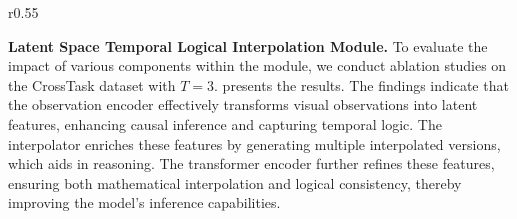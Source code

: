\begin{wraptable}{r}{0.55\textwidth}
\vspace{-10pt}
\centering
\caption{Component ablation. Note: Int: Interpolation, Enc: Encoder, Trans: Transformer.}
\label{tab:component_ablation}
\vspace{-10pt}
\end{wraptable}
\textbf{Latent Space Temporal Logical Interpolation Module.} To evaluate the impact of various components within the module, we conduct ablation studies on the CrossTask dataset with $T=3$.  presents the results. The findings indicate that the observation encoder effectively transforms visual observations into latent features, enhancing causal inference and capturing temporal logic. The interpolator enriches these features by generating multiple interpolated versions, which aids in reasoning. The transformer encoder further refines these features, ensuring both mathematical interpolation and logical consistency, thereby improving the model's inference capabilities.


